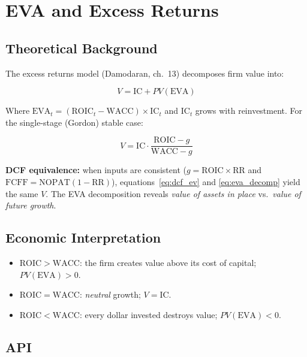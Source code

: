 \documentclass[12pt, a4paper, oneside]{book}
\newcommand{\FCFF}{\ensuremath{\mathrm{FCFF}}}
\newcommand{\WACC}{\ensuremath{\mathrm{WACC}}}
\newcommand{\NOPAT}{\ensuremath{\mathrm{NOPAT}}}
\newcommand{\ROIC}{\ensuremath{\mathrm{ROIC}}}
\newcommand{\IC}{\ensuremath{\mathrm{IC}}}
\newcommand{\EVA}{\ensuremath{\mathrm{EVA}}}
\newcommand{\RR}{\mathrm{RR}}
\begin{document}
\chapter{EVA and Excess Returns}

\section{Theoretical Background}

The excess returns model (Damodaran, ch.~13) decomposes firm value into:

\begin{equation}
  V = \IC + PV(\EVA)
  \label{eq:eva_decomp}
\end{equation}

Where $\EVA_t = (\ROIC_t - \WACC) \times \IC_t$ and $\IC_t$ grows with
reinvestment. For the single-stage (Gordon) stable case:

\begin{equation}
  V = \IC \cdot \frac{\ROIC - g}{\WACC - g}
  \label{eq:eva_single}
\end{equation}

\textbf{DCF equivalence:} when inputs are consistent
($g = \ROIC \times \RR$ and $\FCFF = \NOPAT(1-\RR)$),
equations~\eqref{eq:dcf_ev} and \eqref{eq:eva_decomp} yield the same $V$.
The EVA decomposition reveals \emph{value of assets in place} vs.\
\emph{value of future growth}.

\section{Economic Interpretation}

\begin{itemize}
  \item $\ROIC > \WACC$: the firm creates value above its cost of capital;
        $PV(\EVA) > 0$.
  \item $\ROIC = \WACC$: \emph{neutral} growth; $V = \IC$.
  \item $\ROIC < \WACC$: every dollar invested destroys value; $PV(\EVA) < 0$.
\end{itemize}

\section{API}
\end{document}
